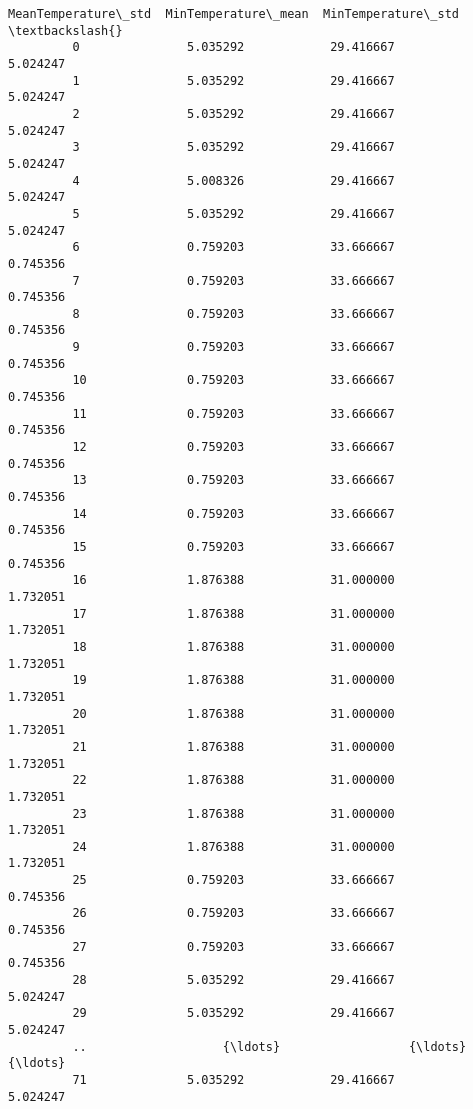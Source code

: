 \documentclass[11pt]{article}
\begin{document}
\begin{Verbatim}[commandchars=\\\{\}]
              MeanTemperature\_std  MinTemperature\_mean  MinTemperature\_std  \textbackslash{}
         0               5.035292            29.416667            5.024247   
         1               5.035292            29.416667            5.024247   
         2               5.035292            29.416667            5.024247   
         3               5.035292            29.416667            5.024247   
         4               5.008326            29.416667            5.024247   
         5               5.035292            29.416667            5.024247   
         6               0.759203            33.666667            0.745356   
         7               0.759203            33.666667            0.745356   
         8               0.759203            33.666667            0.745356   
         9               0.759203            33.666667            0.745356   
         10              0.759203            33.666667            0.745356   
         11              0.759203            33.666667            0.745356   
         12              0.759203            33.666667            0.745356   
         13              0.759203            33.666667            0.745356   
         14              0.759203            33.666667            0.745356   
         15              0.759203            33.666667            0.745356   
         16              1.876388            31.000000            1.732051   
         17              1.876388            31.000000            1.732051   
         18              1.876388            31.000000            1.732051   
         19              1.876388            31.000000            1.732051   
         20              1.876388            31.000000            1.732051   
         21              1.876388            31.000000            1.732051   
         22              1.876388            31.000000            1.732051   
         23              1.876388            31.000000            1.732051   
         24              1.876388            31.000000            1.732051   
         25              0.759203            33.666667            0.745356   
         26              0.759203            33.666667            0.745356   
         27              0.759203            33.666667            0.745356   
         28              5.035292            29.416667            5.024247   
         29              5.035292            29.416667            5.024247   
         ..                   {\ldots}                  {\ldots}                 {\ldots}   
         71              5.035292            29.416667            5.024247   

\end{Verbatim}
\end{document}
